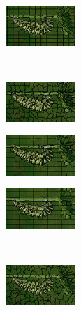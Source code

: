 \begin{figure}
\begin{subfigure}[b]{0.141\textwidth}
	\end{subfigure}
	\begin{subfigure}[b]{0.141\textwidth}
		\includegraphics[height=1.525cm]{pictures/compactness/bsds500/cw/score/1/cropped/cw_35028_contours}
	\end{subfigure}\\
	\begin{subfigure}[b]{0.02\textwidth}
	\end{subfigure}
	\begin{subfigure}[b]{0.141\textwidth}
		\includegraphics[height=1.525cm]{pictures/compactness/bsds500/preslic/score/5/cropped/preslic_35028_contours}
	\end{subfigure}
	\begin{subfigure}[b]{0.141\textwidth}
		\includegraphics[height=1.525cm]{pictures/compactness/bsds500/preslic/score/20/cropped/preslic_35028_contours}
	\end{subfigure}
	\begin{subfigure}[b]{0.141\textwidth}
		\includegraphics[height=1.525cm]{pictures/compactness/bsds500/preslic/score/80/cropped/preslic_35028_contours}
	\end{subfigure}\\
	\begin{subfigure}[b]{0.02\textwidth}
	\end{subfigure}
	\begin{subfigure}[b]{0.141\textwidth}
		\includegraphics[height=1.525cm]{pictures/compactness/bsds500/wp/score/1/cropped/wp_35028_contours}

\end{subfigure}
\end{figure}
